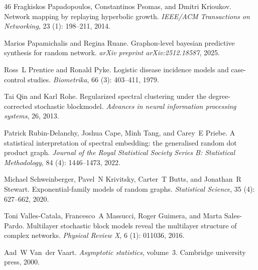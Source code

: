 \documentclass[12pt]{article}
\newcommand{\1}{\mathbf{1}}
\begin{document}
\begin{thebibliography}{46}
Fragkiskos Papadopoulos, Constantinos Psomas, and Dmitri Krioukov.
\newblock Network mapping by replaying hyperbolic growth.
\newblock \emph{IEEE/ACM Transactions on Networking}, 23 (1):
  198--211, 2014.

Marios Papamichalis and Regina Ruane.
\newblock Graphon-level bayesian predictive synthesis for random network.
\newblock \emph{arXiv preprint arXiv:2512.18587}, 2025.

Ross~L Prentice and Ronald Pyke.
\newblock Logistic disease incidence models and case-control studies.
\newblock \emph{Biometrika}, 66 (3): 403--411, 1979.

Tai Qin and Karl Rohe.
\newblock Regularized spectral clustering under the degree-corrected stochastic
  blockmodel.
\newblock \emph{Advances in neural information processing systems}, 26, 2013.

Patrick Rubin-Delanchy, Joshua Cape, Minh Tang, and Carey~E Priebe.
\newblock A statistical interpretation of spectral embedding: the generalised
  random dot product graph.
\newblock \emph{Journal of the Royal Statistical Society Series B: Statistical
  Methodology}, 84 (4): 1446--1473, 2022.

Michael Schweinberger, Pavel~N Krivitsky, Carter~T Butts, and Jonathan~R
  Stewart.
\newblock Exponential-family models of random graphs.
\newblock \emph{Statistical Science}, 35 (4): 627--662, 2020.

Toni Valles-Catala, Francesco~A Massucci, Roger Guimera, and Marta Sales-Pardo.
\newblock Multilayer stochastic block models reveal the multilayer structure of
  complex networks.
\newblock \emph{Physical Review X}, 6 (1): 011036, 2016.

Aad~W Van~der Vaart.
\newblock \emph{Asymptotic statistics}, volume~3.
\newblock Cambridge university press, 2000.


\end{thebibliography}
\end{document}
